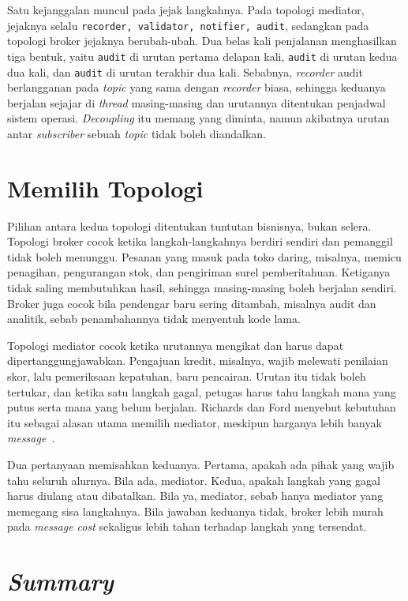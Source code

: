 Satu kejanggalan muncul pada jejak langkahnya. Pada topologi mediator, jejaknya
selalu \texttt{recorder, validator, notifier, audit}, sedangkan pada topologi
broker jejaknya berubah-ubah. Dua belas kali penjalanan menghasilkan tiga
bentuk, yaitu \texttt{audit} di urutan pertama delapan kali, \texttt{audit} di
urutan kedua dua kali, dan \texttt{audit} di urutan terakhir dua kali.
Sebabnya, \textit{recorder} audit berlangganan pada \textit{topic} yang sama dengan \textit{recorder}
biasa, sehingga
keduanya berjalan sejajar di \textit{thread} masing-masing dan urutannya
ditentukan penjadwal sistem operasi. \textit{Decoupling} itu memang yang diminta,
namun akibatnya urutan antar \textit{subscriber} sebuah \textit{topic} tidak boleh diandalkan.

\section{Memilih Topologi}

Pilihan antara kedua topologi ditentukan tuntutan bisnisnya, bukan selera.
Topologi broker cocok ketika langkah-langkahnya berdiri sendiri dan pemanggil
tidak boleh menunggu. Pesanan yang masuk pada toko daring, misalnya, memicu
penagihan, pengurangan stok, dan pengiriman surel pemberitahuan. Ketiganya tidak
saling membutuhkan hasil, sehingga masing-masing boleh berjalan sendiri.
Broker juga cocok bila pendengar baru sering ditambah, misalnya audit dan
analitik, sebab penambahannya tidak menyentuh kode lama.

Topologi mediator cocok ketika urutannya mengikat dan harus dapat
dipertanggungjawabkan. Pengajuan kredit, misalnya, wajib melewati penilaian
skor, lalu pemeriksaan kepatuhan, baru pencairan. Urutan itu tidak boleh
tertukar, dan ketika satu langkah gagal, petugas harus tahu langkah mana yang
putus serta mana yang belum berjalan. Richards dan Ford menyebut kebutuhan itu
sebagai alasan utama memilih mediator, meskipun harganya lebih banyak
\textit{message}~\cite{richards2020fundamentals}.

Dua pertanyaan memisahkan keduanya. Pertama, apakah ada pihak yang wajib tahu
seluruh alurnya. Bila ada, mediator. Kedua, apakah langkah yang gagal harus
diulang atau dibatalkan. Bila ya, mediator, sebab hanya mediator yang memegang
sisa langkahnya. Bila jawaban keduanya tidak, broker lebih murah pada
\textit{message cost} sekaligus
lebih tahan terhadap langkah yang tersendat.

\section{\textit{Summary}}

